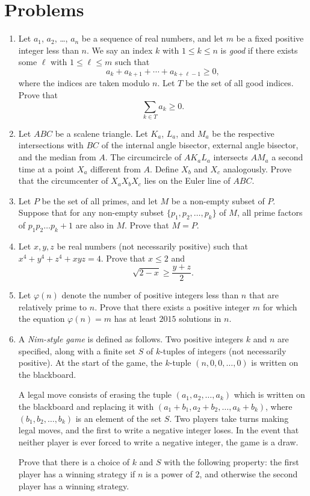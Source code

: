 \documentclass[11pt]{scrartcl}
\begin{document}
\section{Problems}
\begin{enumerate}[\bfseries 1.]
\item %
Let $a_1$, $a_2$, \dots, $a_n$ be a sequence of real numbers,
and let $m$ be a fixed positive integer less than $n$.
We say an index $k$ with $1 \le k \le n$ is \textit{good} if there exists
some $\ell$ with $1 \le \ell \le m$ such that
\[ a_k + a_{k + 1} + \dotsb + a_{k + \ell - 1} \ge 0, \]
where the indices are taken modulo $n$.
Let $T$ be the set of all good indices. Prove that
\[ \sum_{k \in T} a_k \ge 0. \]

\item %
Let $ABC$ be a scalene triangle. Let $K_a$, $L_a$, and
$M_a$ be the respective intersections with $BC$ of the internal
angle bisector, external angle bisector, and the median from
$A$. The circumcircle of $AK_aL_a$ intersects $AM_a$ a second time
at a point $X_a$ different from $A$. Define $X_b$ and $X_c$
analogously. Prove that the circumcenter of $X_aX_bX_c$ lies on
the Euler line of $ABC$.

\item %
Let $P$ be the set of all primes, and let $M$ be a
non-empty subset of $P$. Suppose that for any non-empty subset
$\{p_1, p_2, \dots, p_k\}$ of $M$, all prime factors of
$p_1 p_2 \dots p_k + 1$ are also in $M$. Prove that $M = P$.

\item %
Let $x,y,z$ be real numbers (not necessarily positive)
such that $x^4 + y^4 + z^4 + xyz = 4$.
Prove that $x \le 2$ and \[ \sqrt{2-x} \ge \frac{y+z}{2}. \]

\item %
Let $\varphi(n)$ denote the number of positive integers
less than $n$ that are relatively prime to $n$.
Prove that there exists a positive integer $m$ for which the equation
$\varphi(n) = m$ has at least $2015$ solutions in $n$.

\item %
A \emph{Nim-style game} is defined as follows. Two
positive integers $k$ and $n$ are specified, along with a finite
set $S$ of $k$-tuples of integers (not necessarily positive). At
the start of the game, the $k$-tuple $(n,0,0,\dots,0)$ is written
on the blackboard.

A legal move consists of erasing the tuple $(a_1,a_2,\dots,a_k)$
which is written on the blackboard and replacing it with
$(a_1+b_1,a_2+b_2,\dots,a_k+b_k)$, where $(b_1,b_2,\dots,b_k)$
is an element of the set $S$. Two players take turns making legal
moves, and the first to write a negative integer loses. In the
event that neither player is ever forced to write a negative
integer, the game is a draw.

Prove that there is a choice of $k$ and $S$ with the following
property: the first player has a winning strategy if $n$ is a
power of $2$, and otherwise the second player has a winning
strategy.

\end{enumerate}
\pagebreak
\end{document}
